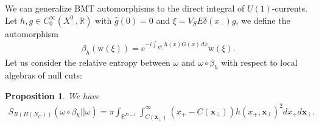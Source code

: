 \documentclass[12pt]{article}
\def\RR{{\mathbb R}}
\def\tx{\pmb{x}}
\newtheorem{proposition}[theorem]{Proposition}
\theoremstyle{remark}
\begin{document}
We can generalize BMT automorphisms to the direct integral of $U(1)$-currents.
Let $h,g\in C_0^\infty(X_-^0,\RR)$ with $\hat{g}(0)=0$ and $\xi=V_SE\delta(x_-)g$, we define the automorphism
\begin{align*}
\beta_h(\mathrm w(\xi))=e^{-i\int_{X_-^0} h(x)G(x)\,dx}\mathrm w(\xi). 
\end{align*}
Let us consider the relative entropy between $\omega$ and $\omega\circ \beta_h$ with respect to local algebras of null cuts:	
	\begin{proposition}\label{prop:rel-entr-coherent-state}
    We have
			\begin{align*}
				S_{R(H(N_C))}(\omega \circ \beta_h||\omega)=\pi \int_{\RR^{D-1}}\int_{C(\tx_\perp)}^\infty (x_+-C(\tx_\perp)) h(x_+,\tx_\perp)^2 dx_+ d\tx_\perp.
			\end{align*}
	\end{proposition}
\end{document}
